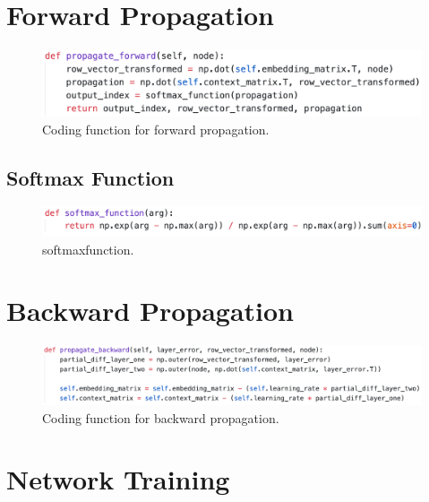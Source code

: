 \section{Forward Propagation}

\begin{figure}[H]
    \centering
    \includegraphics[width=\textwidth]{figures/chapter-6/forwardpropagation.png}
    \caption[Coding function for forward propagation]{Coding function for forward propagation.
    \label{fig:forwardpropagation}}
\end{figure}

\subsection{Softmax Function}

\begin{figure}[H]
    \centering
    \includegraphics[width=\textwidth]{figures/chapter-6/softmaxfunction.png}
    \caption[softmaxfunction]{softmaxfunction.
    \label{fig:softmaxfunction}}
\end{figure}

\section{Backward Propagation}

\begin{figure}[H]
    \centering
    \includegraphics[width=\textwidth]{figures/chapter-6/backwardpropagation.png}
    \caption[Coding function for backward propagation]{Coding function for backward propagation.
    \label{fig:backwardpropagation}}
\end{figure}

\section{Network Training}

